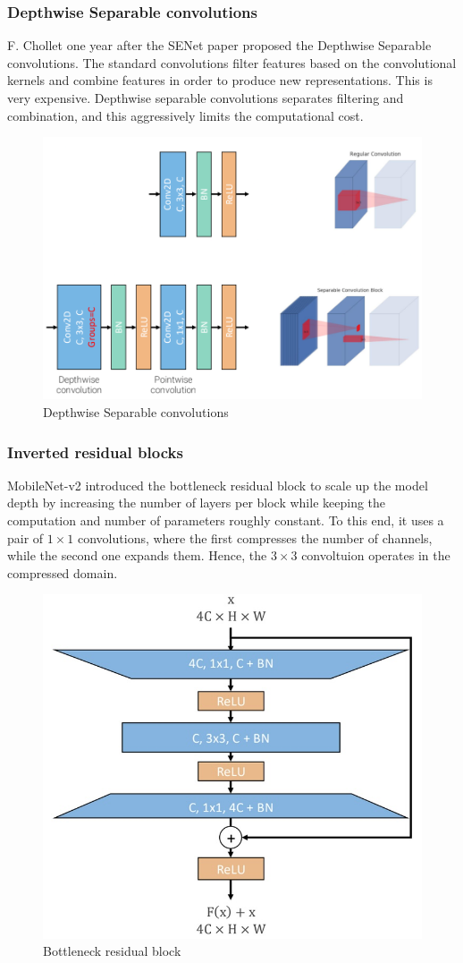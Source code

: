 \subsubsection{Depthwise Separable convolutions}
F. Chollet one year after the SENet paper proposed the Depthwise Separable convolutions.
The standard convolutions filter features based on the convolutional kernels and combine features in order to produce new representations.
This is very expensive.
Depthwise separable convolutions separates filtering and combination, and this aggressively limits the computational cost.

\begin{figure}[htbp]
  \centering
  \includegraphics[width=0.5\linewidth]{./img/separable_convolution.png}
  \caption{Depthwise Separable convolutions}
\end{figure}

\subsubsection{Inverted residual blocks}
MobileNet-v2 introduced the bottleneck residual block to scale up the model depth by increasing the number of layers per block while keeping the computation and number of parameters roughly constant.
To this end, it uses a pair of $1\times 1$ convolutions, where the first compresses the number of channels, while the second one expands them.
Hence, the $3\times 3$ convoltuion operates in the compressed domain.

\begin{figure}[htbp]
  \centering
  \includegraphics[width=0.4\linewidth]{./img/bottleneck_residual.jpg}
  \caption{Bottleneck residual block}
\end{figure}

